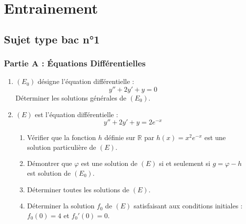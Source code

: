 \chapter{Entrainement}


\section*{Sujet type bac n°1}

\subsection*{Partie A : Équations Différentielles}
\begin{enumerate}
	\item $(E_{0})$ désigne l'équation différentielle :
	\begin{equation*}
		y'' + 2y' + y = 0
	\end{equation*}
	Déterminer les solutions générales de $(E_{0})$.

	\item $(E)$ est l'équation différentielle :
	\begin{equation*}
		y'' + 2y' + y = 2e^{-x}
	\end{equation*}
	\begin{enumerate}
		\item Vérifier que la fonction $h$ définie sur $\mathbb{R}$ par $h(x) = x^2e^{-x}$ est une solution particulière de $(E)$.
		\item Démontrer que $\varphi$ est une solution de $(E)$ si et seulement si $g = \varphi - h$ est solution de $(E_{0})$.
		\item Déterminer toutes les solutions de $(E)$.
		\item Déterminer la solution $f_{0}$ de $(E)$ satisfaisant aux conditions initiales : $f_{0}(0) = 4$ et $f_{0}'(0) = 0$.
	\end{enumerate}
\end{enumerate}

